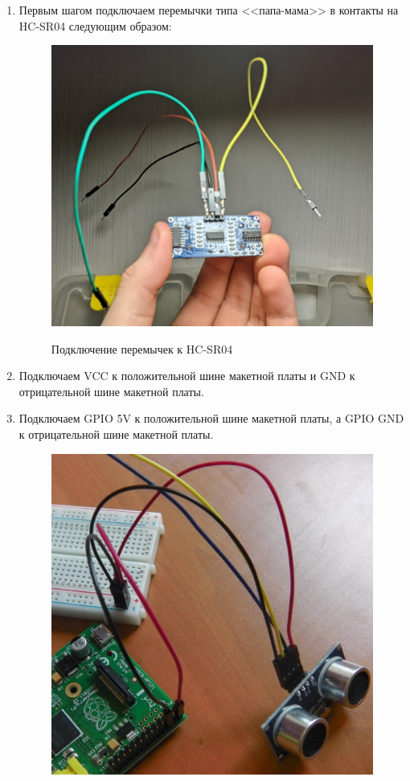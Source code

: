 \documentclass[a4paper, 14pt]{article}
\begin{document}
\begin{enumerate}
	\item Первым шагом подключаем перемычки типа <<папа-мама>> в контакты на HC-SR04 следующим образом:
	      \begin{figure}[H]
		      \centering
		      \includegraphics[width=14cm]{screenshots/6.png}\\
		      \caption{Подключение перемычек к HC-SR04}
	      \end{figure}
	\item Подключаем VCC к положительной шине макетной платы и GND к отрицательной шине макетной платы.
	\item Подключаем GPIO 5V к положительной шине макетной платы, а GPIO GND к отрицательной шине макетной платы.
	      \begin{figure}[H]
		      \centering
		      \includegraphics[width=14cm]{screenshots/7.png}\\

\end{figure}
\end{enumerate}
\end{document}
